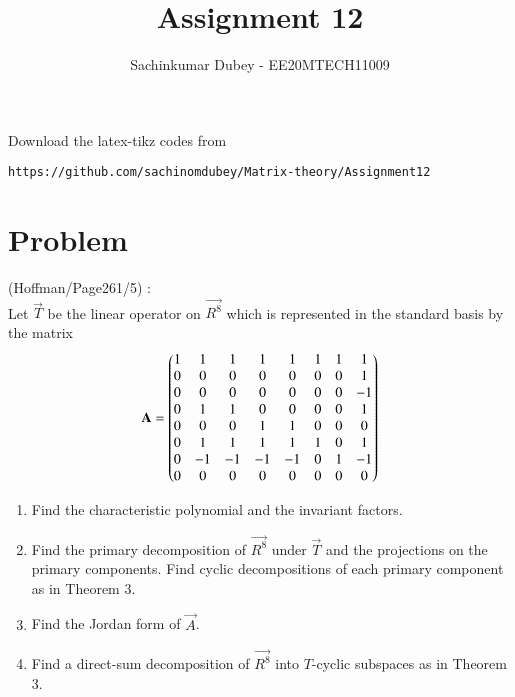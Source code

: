\documentclass[journal,12pt]{IEEEtran}
\begin{document}
\renewcommand{\thefigure}{\theproblem}

\def\putbox#1#2#3{\makebox[0in][l]{\makebox[#1][l]{}\raisebox{\baselineskip}[0in][0in]{\raisebox{#2}[0in][0in]{#3}}}}
     \def\rightbox#1{\makebox[0in][r]{#1}}
     \def\centbox#1{\makebox[0in]{#1}}
     \def\topbox#1{\raisebox{-\baselineskip}[0in][0in]{#1}}
     \def\midbox#1{\raisebox{-0.5\baselineskip}[0in][0in]{#1}}
\vspace{3cm}
\title{Assignment 12}
\author{Sachinkumar Dubey - EE20MTECH11009}
\maketitle
\bigskip
\renewcommand{\thefigure}{\theenumi}
\renewcommand{\thetable}{\theenumi}
%
Download the latex-tikz codes from 
%
\begin{lstlisting}
https://github.com/sachinomdubey/Matrix-theory/Assignment12
\end{lstlisting}
\section{\textbf{Problem}}
(Hoffman/Page261/5) : \\
%
Let $\vec{T}$ be the linear operator on $\vec{R^8}$ which is represented in the standard basis by the matrix 
\begin{align}
    \mathbf{A}=\begin{pmatrix}
1 &1  &1  &1  &1  &1  &1  &1 \\ 
 0&0  &0  &0  &0  &0  &0  &1 \\ 
0 &0  &0  &0  &0  &0  &0  &-1 \\ 
0 &1  &1  &0  &0  &0  &0  &1 \\ 
0 &0  &0  &1  &1  &0  &0  &0 \\ 
0 &1  &1  &1  &1  &1  &0  &1 \\ 
0 &-1  &-1  &-1  &-1  &0  &1  &-1 \\ 
0 &0  &0  &0  &0  &0  &0  &0 \end{pmatrix}
\end{align}
\begin{enumerate}
    \item Find the characteristic polynomial and the invariant factors.
    \item Find the primary decomposition of $\vec{R^8}$ under $\vec{T}$ and the projections on the primary components. Find cyclic decompositions of each primary component as in Theorem 3. 
    \item Find the Jordan form of $\vec{A}$.
    \item Find a direct-sum decomposition of $\vec{R^8}$ into $T$-cyclic subspaces as in Theorem 3.  
\end{enumerate}
\end{document}
